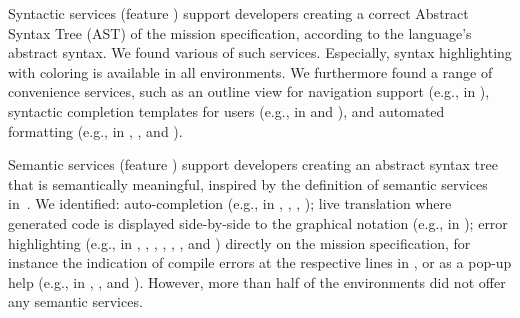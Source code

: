 
Syntactic services (feature \fsyntacticservices) support developers creating a correct Abstract Syntax Tree (AST) of the mission specification, according to the language's abstract syntax. We found various of such services. Especially, syntax highlighting with coloring is available in all environments.  %
We furthermore found a range of convenience services, such as an outline view for navigation support (e.g., in \picaxe), syntactic completion templates for users (e.g., in \edison and \ardublockly), and automated formatting (e.g., in \arcbotics, \robotmesh, and \vex).




Semantic services (feature \fsemanticservices) support developers creating an abstract syntax tree that is semantically meaningful, inspired by the definition of semantic services in~\citet{erdweg2013languageworkbenches}. We identified: auto-completion (e.g., in \vex, \trik, \picaxe, \edison);  live translation where generated code is displayed side-by-side to the graphical notation (e.g., in \easyc); error highlighting (e.g., in \edison, \aseba, \vex, \robotmesh, \blocklyprop, \minibloq, and \easyc) directly on the mission specification, for instance the indication of compile errors at the respective lines in \blocklyprop, or as a pop-up help (e.g., in \edison, \missionlab, and \choregraphe). However, more than half of the environments did not offer any semantic services. %


